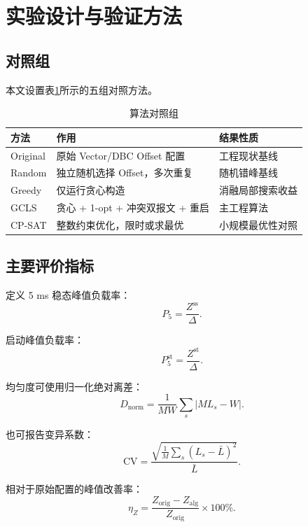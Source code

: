 \documentclass[UTF8,12pt,a4paper]{ctexart}
\begin{document}
\section{实验设计与验证方法}

\subsection{对照组}

本文设置表\ref{tab:baselines}所示的五组对照方法。

\begin{table}[htbp]
\centering
\caption{算法对照组}
\label{tab:baselines}
\begin{tabularx}{\textwidth}{lXl}
\toprule
方法 & 作用 & 结果性质\\
\midrule
Original & 原始 Vector/DBC Offset 配置 & 工程现状基线\\
Random & 独立随机选择 Offset，多次重复 & 随机错峰基线\\
Greedy & 仅运行贪心构造 & 消融局部搜索收益\\
GCLS & 贪心 + 1-opt + 冲突双报文 + 重启 & 主工程算法\\
CP-SAT & 整数约束优化，限时或求最优 & 小规模最优性对照\\
\bottomrule
\end{tabularx}
\end{table}

\subsection{主要评价指标}

定义 5 ms 稳态峰值负载率：
\begin{equation}
 P_5=\frac{Z^{\mathrm{ss}}}{\Delta}.
\end{equation}

启动峰值负载率：
\begin{equation}
 P^{\mathrm{st}}_5=\frac{Z^{\mathrm{st}}}{\Delta}.
\end{equation}

均匀度可使用归一化绝对离差：
\begin{equation}
 D_{\mathrm{norm}}=
 \frac{1}{MW}\sum_s\left|ML_s-W\right|.
\end{equation}

也可报告变异系数：
\begin{equation}
 \mathrm{CV}=\frac{\sqrt{\frac{1}{M}\sum_s(L_s-\bar L)^2}}{\bar L}.
\end{equation}

相对于原始配置的峰值改善率：
\begin{equation}
 \eta_Z=\frac{Z_{\mathrm{orig}}-Z_{\mathrm{alg}}}{Z_{\mathrm{orig}}}\times100\%.
\end{equation}
\end{document}
